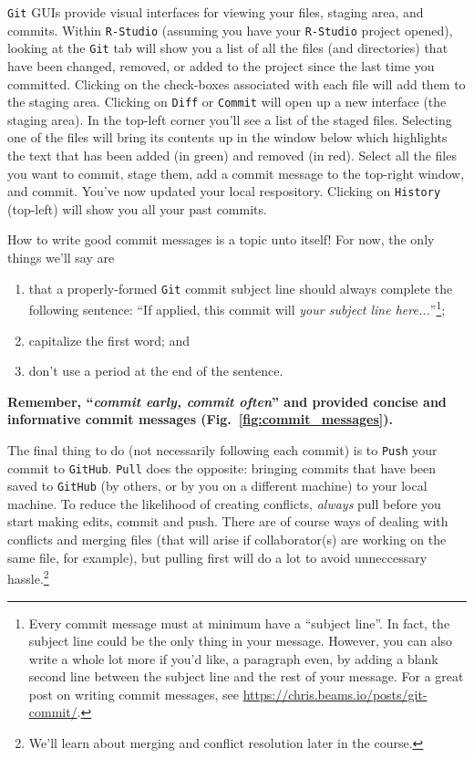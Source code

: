 \documentclass[12pt,letterpaper]{article}
\begin{document}
\texttt{Git} GUIs provide visual interfaces for viewing your files, staging area, 
and commits.
Within \texttt{R-Studio} (assuming you have your \texttt{R-Studio} project 
opened), looking at the \texttt{Git} tab will show you a list of all the files (and 
directories) that have been changed, removed, or added to the project since the 
last time you committed.
Clicking on the check-boxes associated with each file will add them to the staging area.
Clicking on \texttt{Diff} or \texttt{Commit} will open up a new interface (the staging area).
In the top-left corner you'll see a list of the staged files.
Selecting one of the files will bring its contents up in the window below which highlights the text that has been added (in green) and removed (in red).
Select all the files you want to commit, stage them, add a commit message to the top-right window, and commit.
You've now updated your local respository.
Clicking on \texttt{History} (top-left) will show you all your past commits.

How to write good commit messages is a topic unto itself!  
For now, the only things we'll say are 
\begin{enumerate}
	\item that a properly-formed \texttt{Git} commit subject line should always 
	complete the following sentence:  
``If applied, this commit will \emph{your subject line here...}''\footnote{Every 
commit 
message must at minimum have a ``subject line''.  
In fact, the subject line could be the only thing in your message.  
However, you can also write a whole lot more if you'd like, a paragraph even, 
by adding a blank second line between the subject line and the rest of your 
message.  
For a great post on writing commit messages, see 
\url{https://chris.beams.io/posts/git-commit/}.};
	\item capitalize the first word; and
	\item don't use a period at the end of the sentence.	
\end{enumerate} 

\textbf{Remember, ``\emph{commit early, commit often}'' and provided concise 
and informative commit messages (Fig.~\ref{fig:commit_messages}).}

The final thing to do (not necessarily following each commit) is to \texttt{Push} 
your commit to \texttt{GitHub}.
\texttt{Pull} does the opposite: bringing commits that have been saved to 
\texttt{GitHub} (by others, or by you on a different machine) to your local 
machine.
To reduce the likelihood of creating conflicts, \emph{always} pull before you start making edits, commit and push.
There are of course ways of dealing with conflicts and merging files (that will arise if collaborator(s) are working on the same file, for example), but pulling first will do a lot to avoid unneccessary hassle.\footnote{We'll learn about merging and conflict resolution later in the course.}
\end{document}
